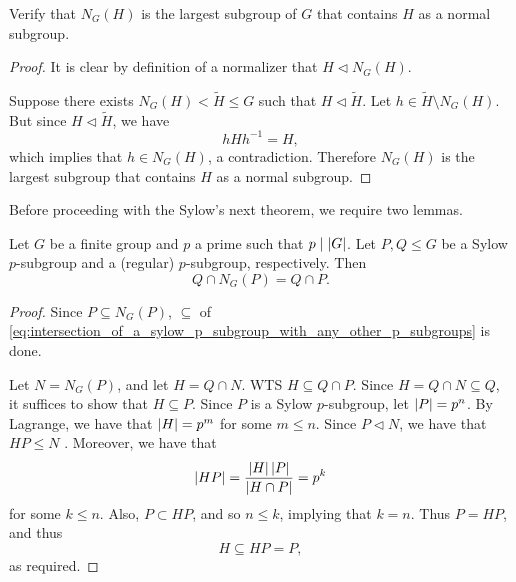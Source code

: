 \documentclass[notoc,notitlepage,nobib]{tufte-book}
\begin{document}
\begin{ex}
  Verify that $N_G(H)$ is the largest subgroup of $G$
  that contains $H$ as a normal subgroup.
\end{ex}

\begin{proof}
  It is clear by definition of a normalizer that $H \triangleleft N_G(H)$.

  Suppose there exists $N_G(H) < \tilde{H} \leq G$ such that
  $H \triangleleft \tilde{H}$. Let $h \in \tilde{H} \setminus N_G(H)$.
  But since $H \triangleleft \tilde{H}$, we have
  \begin{equation*}
    hHh^{-1} = H,
  \end{equation*}
  which implies that $h \in N_G(H)$, a contradiction.
  Therefore $N_G(H)$ is the largest subgroup that contains $H$ as a
  normal subgroup.
\end{proof}

Before proceeding with the Sylow's next theorem, we require two lemmas.

\begin{lemma}\label{lemma:intersection_of_a_sylow_p_subgroup_with_any_other_p_subgroups}
  Let $G$ be a finite group and $p$ a prime such that $p \mid \left|G\right|$.
  Let $P, Q \leq G$ be a Sylow $p$-subgroup and a (regular) $p$-subgroup,
  respectively. Then
  \begin{equation}\label{eq:intersection_of_a_sylow_p_subgroup_with_any_other_p_subgroups}
    Q \cap N_G(P) = Q \cap P.
  \end{equation}
\end{lemma}

\begin{proof}
  Since $P \subseteq N_G(P)$, $\subseteq$ of \cref{eq:intersection_of_a_sylow_p_subgroup_with_any_other_p_subgroups} is done.

  Let $N = N_G(P)$, and let $H = Q \cap N$. WTS $H \subseteq Q \cap P$.
  Since $H = Q \cap N \subseteq Q$, it suffices to show that $H \subseteq P$.
  Since $P$ is a Sylow $p$-subgroup, let $\left|P\right| = p^n$. By Lagrange,
  we have that $\left|H\right| = p^m$ for some $m \leq n$. Since $P \triangleleft N$,
  we have that $HP \leq N$ 
  .
  Moreover, we have that
  \begin{equation*}
    \left|HP\right| = \frac{\left|H\right|\left|P\right|}{\left|H \cap P\right|} = p^k
  \end{equation*}
  for some $k \leq n$. Also, $P \subset HP$, and so $n \leq k$,
  implying that $k = n$. Thus $P = HP$, and thus
  \begin{equation*}
    H \subseteq HP = P,
  \end{equation*}
  as required.
\end{proof}
\end{document}
